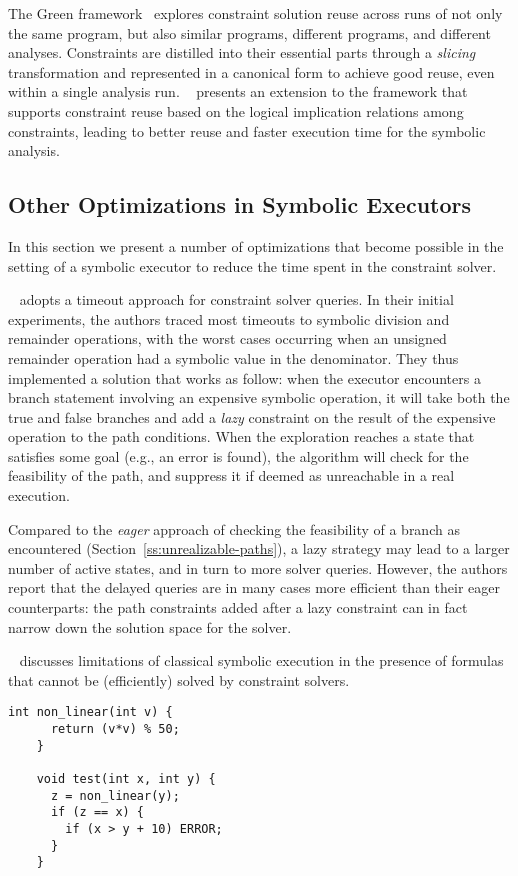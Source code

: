 The Green framework~\cite{GREEN-FSE12} explores constraint solution reuse across runs of not only the same program, but also similar programs, different programs, and different analyses. Constraints are distilled into their essential parts through a {\em slicing} transformation and represented in a canonical form to achieve good reuse, even within a single analysis run. ~\cite{JGY-ISSTA15} presents an extension to the framework that supports constraint reuse based on the logical implication relations among constraints, leading to better reuse and faster execution time for the symbolic analysis.

\subsection{Other Optimizations in Symbolic Executors}
In this section we present a number of optimizations that become possible in the setting of a symbolic executor to reduce the time spent in the constraint solver.

\medskip{}
~\cite{UCKLEE-USEC15} adopts a timeout approach for constraint solver queries. In their initial experiments, the authors traced most timeouts to symbolic division and remainder operations, with the worst cases occurring when an unsigned remainder operation had a symbolic value in the denominator.
They thus implemented a solution that works as follow: when the executor encounters a branch statement involving an expensive symbolic operation, it will take both the true and false branches and add a {\em lazy} constraint on the result of the expensive operation to the path conditions. When the exploration reaches a state that satisfies some goal (e.g., an error is found), the algorithm will check for the feasibility of the path, and suppress it if deemed as unreachable in a real execution.

Compared to the {\em eager} approach of checking the feasibility of a branch as encountered (Section~\ref{ss:unrealizable-paths}), a lazy strategy may lead to a larger number of active states, and in turn to more solver queries. However, the authors report that the delayed queries are in many cases more efficient than their eager counterparts: the path constraints added after a lazy constraint can in fact narrow down the solution space for the solver.

\medskip{}
~\cite{CS-CACM13} discusses limitations of classical symbolic execution in the presence of formulas that cannot be (efficiently) solved by constraint solvers.
    \begin{lstlisting}[basicstyle=\ttfamily\small]
    int non_linear(int v) {
      return (v*v) % 50;
    }
    
    void test(int x, int y) {
      z = non_linear(y);
      if (z == x) {
        if (x > y + 10) ERROR;  
      }
    }
    \end{lstlisting}

